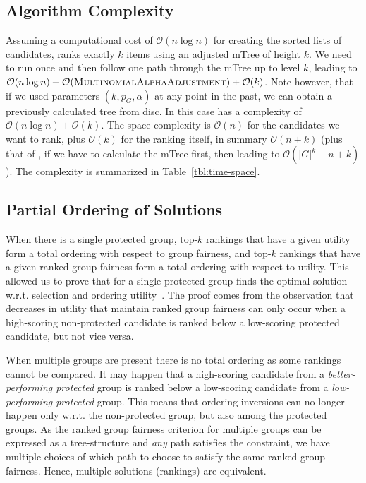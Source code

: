 \subsection{Algorithm Complexity}\label{subsec:FAIR-complexity}
Assuming a computational cost of $\mathcal{O}(n \log{} n)$ for creating the sorted lists of candidates, \algoFAIR ranks exactly $k$ items using an adjusted mTree of height $k$.
%
We need to run \algoMultBinary once and then follow one path through the mTree up to level $k$, leading to $\mathcal{O}(n \log{} n) + \mathcal{O} (\text{{\sc MultinomialAlphaAdjustment}}) + \mathcal{O}(k)$.
%
Note however, that if we used parameters $(k, p_G, \alpha)$ at any point in the past, we can obtain a previously calculated tree from disc.
%
In this case \algoFAIR has a complexity of $\mathcal{O}(n \log{} n) + \mathcal{O}(k)$.
%
The space complexity is $\mathcal{O}(n)$ for the candidates we want to rank, plus $\mathcal{O}(k)$ for the ranking itself, in summary $\mathcal{O}(n + k)$ (plus that of \algoMultBinary, if we have to calculate the mTree first, then leading to $\mathcal{O}(|G|^k + n + k)$).
%
The complexity is summarized in Table~\ref{tbl:time-space}.

\subsection{Partial Ordering of Solutions}

When there is a single protected group,
top-$k$ rankings that have a given utility form a total ordering with respect to group fairness, and
top-$k$ rankings that have a given ranked group fairness form a total ordering with respect to utility.
%
This allowed us to prove that \algoFAIR for a single protected group finds the optimal solution w.r.t. selection and ordering utility~\cite{zehlike2017fair}.
%
The proof comes from the observation that decreases in utility that maintain ranked group fairness can only occur when a high-scoring non-protected candidate is ranked below a low-scoring protected candidate, but not vice versa.
%

When multiple groups are present there is no total ordering as some rankings cannot be compared.
%
It may happen that a high-scoring candidate from a \emph{better-performing protected} group is ranked below a low-scoring candidate from a \emph{low-performing protected} group.
%
This means that ordering inversions can no longer happen only w.r.t. the non-protected group, but also among the protected groups.
%
As the ranked group fairness criterion for multiple groups can be expressed as a tree-structure and \emph{any} path satisfies the constraint, we have multiple choices of which path to choose to satisfy the same ranked group fairness.
%
Hence, multiple solutions (rankings) are equivalent.
%

